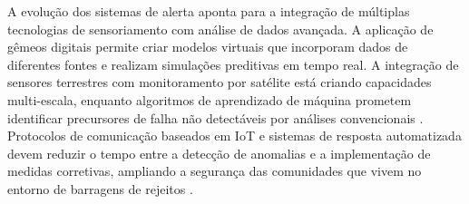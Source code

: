 A evolução dos sistemas de alerta aponta para a integração de múltiplas tecnologias de sensoriamento com análise de dados avançada. A aplicação de gêmeos digitais permite criar modelos virtuais que incorporam dados de diferentes fontes e realizam simulações preditivas em tempo real. A integração de sensores terrestres com monitoramento por satélite está criando capacidades multi-escala, enquanto algoritmos de aprendizado de máquina prometem identificar precursores de falha não detectáveis por análises convencionais \cite{internationalwater2024digital, sequencia2024tempo}. Protocolos de comunicação baseados em IoT e sistemas de resposta automatizada devem reduzir o tempo entre a detecção de anomalias e a implementação de medidas corretivas, ampliando a segurança das comunidades que vivem no entorno de barragens de rejeitos \cite{ufpr2021simepar, radaz2024revolucionando}.